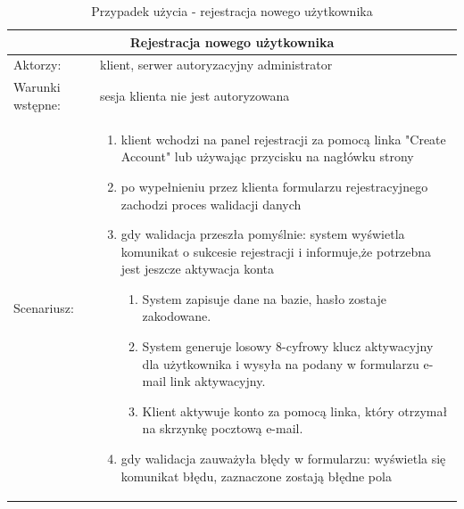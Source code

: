 \begin{table}[h!]

\begin{tabular}{ |p{2cm}||p{13cm}|  }
	
	\hline
	\multicolumn{2}{|c|}{Rejestracja nowego użytkownika} \\
	\hline
	Aktorzy: &klient, serwer autoryzacyjny administrator\\
	\hline
	Warunki wstępne: & sesja klienta nie jest autoryzowana\\ 
	\hline
	Scenariusz: &
	\begin{enumerate}[leftmargin=0em]
		\item klient wchodzi na panel rejestracji za pomocą linka "Create Account" lub używając przycisku na nagłówku strony 
		
		\item po wypełnieniu przez klienta formularzu rejestracyjnego zachodzi proces walidacji danych

		\item  gdy walidacja przeszła pomyślnie: system wyświetla komunikat o sukcesie rejestracji i informuje,że potrzebna jest jeszcze aktywacja konta

	\begin{enumerate}[leftmargin=2em]
	 	\item  System zapisuje dane na bazie, hasło zostaje zakodowane.
	 		
	 		\item  System generuje losowy 8-cyfrowy klucz aktywacyjny dla użytkownika i wysyła na podany w formularzu e-mail link aktywacyjny.
	 		
	 		\item Klient  aktywuje konto za pomocą linka, który otrzymał na skrzynkę pocztową e-mail.
	\end{enumerate}
		
		\item  gdy walidacja zauważyła błędy w formularzu: wyświetla się komunikat błędu, zaznaczone zostają błędne pola
			\end{enumerate}\\
	\hline

\end{tabular}

	\caption{Przypadek użycia - rejestracja nowego użytkownika}
\end{table}

